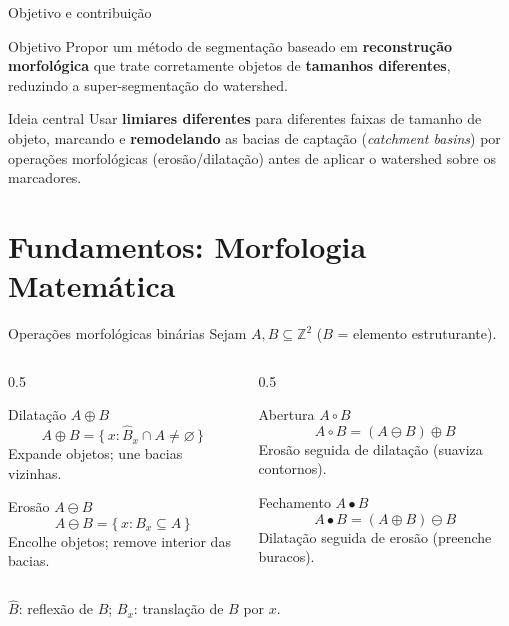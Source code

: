 \documentclass[aspectratio=169,12pt]{beamer}
\begin{document}
\begin{frame}{Objetivo e contribuição}
  \begin{block}{Objetivo}
    Propor um método de segmentação baseado em \textbf{reconstrução morfológica}
    que trate corretamente objetos de \textbf{tamanhos diferentes}, reduzindo a
    super-segmentação do watershed.
  \end{block}
  \begin{block}{Ideia central}
    Usar \textbf{limiares diferentes} para diferentes faixas de tamanho de objeto,
    marcando e \textbf{remodelando} as bacias de captação (\textit{catchment
    basins}) por operações morfológicas (erosão/dilatação) antes de aplicar o
    watershed sobre os marcadores.
  \end{block}
\end{frame}

\section{Fundamentos: Morfologia Matemática}
\begin{frame}{Operações morfológicas binárias}
  Sejam $A, B \subseteq \mathbb{Z}^2$ ($B$ = elemento estruturante).
  \vspace{0.2cm}
  \begin{columns}[T]
    \begin{column}{0.5\textwidth}
      \begin{block}{Dilatação $A \oplus B$}
        \[ A \oplus B = \{\, x : \hat{B}_x \cap A \neq \varnothing \,\} \]
        Expande objetos; \alert{une} bacias vizinhas.
      \end{block}
      \begin{block}{Erosão $A \ominus B$}
        \[ A \ominus B = \{\, x : B_x \subseteq A \,\} \]
        Encolhe objetos; \alert{remove} interior das bacias.
      \end{block}
    \end{column}
    \begin{column}{0.5\textwidth}
      \begin{block}{Abertura $A \circ B$}
        \[ A \circ B = (A \ominus B) \oplus B \]
        Erosão seguida de dilatação (suaviza contornos).
      \end{block}
      \begin{block}{Fechamento $A \bullet B$}
        \[ A \bullet B = (A \oplus B) \ominus B \]
        Dilatação seguida de erosão (preenche buracos).
      \end{block}
    \end{column}
  \end{columns}
  \vspace{0.15cm}
  \footnotesize $\hat{B}$: reflexão de $B$; \; $B_x$: translação de $B$ por $x$.
\end{frame}
\end{document}
